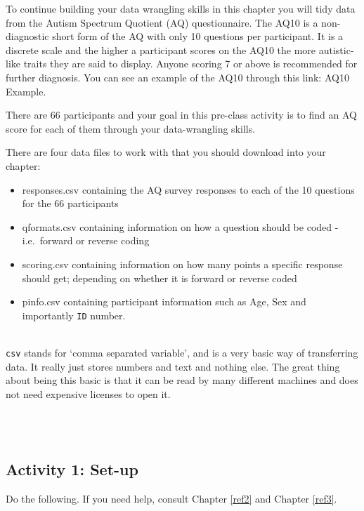 \documentclass[]{book}
\providecommand{\tightlist}{%
  \setlength{\itemsep}{0pt}\setlength{\parskip}{0pt}}
\newenvironment{try}
    {
    \hline\\
    }
    { 
    \\\\\hline
    }
\begin{document}
To continue building your data wrangling skills in this chapter you will tidy data from the Autism Spectrum Quotient (AQ) questionnaire. The AQ10 is a non-diagnostic short form of the AQ with only 10 questions per participant. It is a discrete scale and the higher a participant scores on the AQ10 the more autistic-like traits they are said to display. Anyone scoring 7 or above is recommended for further diagnosis. You can see an example of the AQ10 through this link: AQ10 Example.

There are 66 participants and your goal in this pre-class activity is to find an AQ score for each of them through your data-wrangling skills.

There are four data files to work with that you should download into your chapter:

\begin{itemize}
\tightlist
\item
  responses.csv containing the AQ survey responses to each of the 10 questions for the 66 participants
\item
  qformats.csv containing information on how a question should be coded - i.e.~forward or reverse coding
\item
  scoring.csv containing information on how many points a specific response should get; depending on whether it is forward or reverse coded
\item
  pinfo.csv containing participant information such as Age, Sex and importantly \texttt{ID} number.
\end{itemize}

\begin{try}
\texttt{csv} stands for `comma separated variable', and is a very basic
way of transferring data. It really just stores numbers and text and
nothing else. The great thing about being this basic is that it can be
read by many different machines and does not need expensive licenses to
open it.
\end{try}

\hypertarget{activity-1-set-up-3}{%
\subsection{Activity 1: Set-up}\label{activity-1-set-up-3}}

Do the following. If you need help, consult Chapter \ref{ref2} and Chapter \ref{ref3}.
\end{document}
